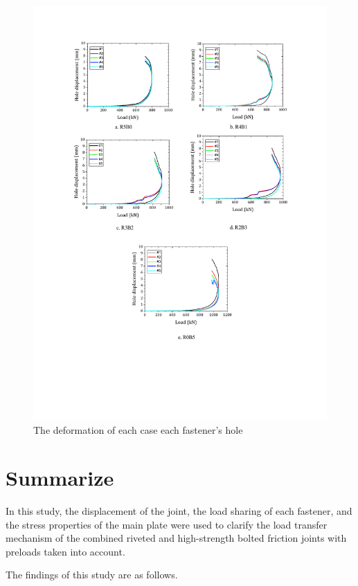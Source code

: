 \begin{figure}
    \centering
    \includegraphics[width=1\linewidth]{imgs//ch4/fig-5rholedef.pdf}
    \caption{The deformation of each case each fastener's hole}
    \label{fig-5rholedef}
\end{figure}

\section{Summarize}
In this study, the displacement of the joint, the load sharing of each fastener, and the stress properties of the main plate were used to clarify the load transfer mechanism of the combined riveted and high-strength bolted friction joints with preloads taken into account.

The findings of this study are as follows.

